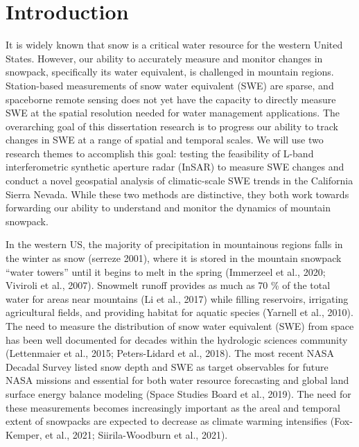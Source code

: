 
\hypertarget{ch1}{%
\chapter{Introduction}\label{ch1}}


It is widely known that snow is a critical water resource for the western United States. However, our ability to accurately measure and monitor changes in snowpack, specifically its water equivalent, is challenged in mountain regions. Station-based measurements of snow water equivalent (SWE) are sparse, and spaceborne remote sensing does not yet have the capacity to directly measure SWE at the spatial resolution needed for water management applications. The overarching goal of this dissertation research is to progress our ability to track changes in SWE at a range of spatial and temporal scales. We will use two research themes to accomplish this goal: testing the feasibility of L-band interferometric synthetic aperture radar (InSAR) to measure SWE changes and conduct a novel geospatial analysis of climatic-scale SWE trends in the California Sierra Nevada. While these two methods are distinctive, they both work towards forwarding our ability to understand and monitor the dynamics of mountain snowpack. \par

In the western US, the majority of precipitation in mountainous regions falls in the winter as snow (serreze 2001), where it is stored in the mountain snowpack “water towers” until it begins to melt in the spring (Immerzeel et al., 2020; Viviroli et al., 2007). Snowmelt runoff provides as much as 70 \% of the total water for areas near mountains (Li et al., 2017) while filling reservoirs, irrigating agricultural fields, and providing habitat for aquatic species (Yarnell et al., 2010).
The need to measure the distribution of snow water equivalent (SWE) from space has been well documented for decades within the hydrologic sciences community (Lettenmaier et al., 2015; Peters-Lidard et al., 2018). The most recent NASA Decadal Survey listed snow depth and SWE as target observables for future NASA missions and essential for both water resource forecasting and global land surface energy balance modeling (Space Studies Board et al., 2019). The need for these measurements becomes increasingly important as the areal and temporal extent of snowpacks are expected to decrease as climate warming intensifies (Fox-Kemper, et al., 2021; Siirila-Woodburn et al., 2021). \par

